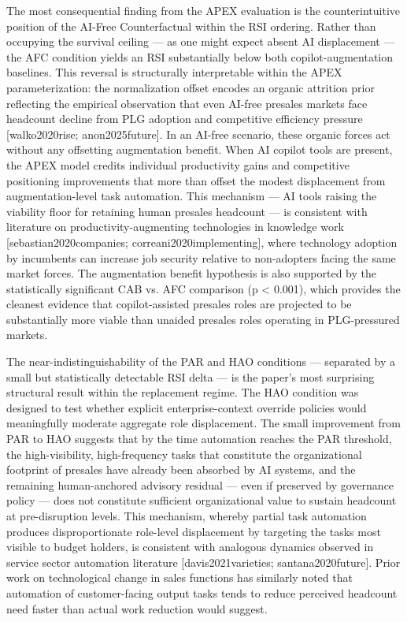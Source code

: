 \documentclass[10pt, conference]{IEEEtran}
\begin{document}
{The most consequential finding from the APEX evaluation is the counterintuitive position of the AI-Free Counterfactual within the RSI ordering. Rather than occupying the survival ceiling --- as one might expect absent AI displacement --- the AFC condition yields an RSI substantially below both copilot-augmentation baselines. This reversal is structurally interpretable within the APEX parameterization: the normalization offset encodes an organic attrition prior reflecting the empirical observation that even AI-free presales markets face headcount decline from PLG adoption and competitive efficiency pressure [walko2020rise; anon2025future]. In an AI-free scenario, these organic forces act without any offsetting augmentation benefit. When AI copilot tools are present, the APEX model credits individual productivity gains and competitive positioning improvements that more than offset the modest displacement from augmentation-level task automation. This mechanism --- AI tools raising the viability floor for retaining human presales headcount --- is consistent with literature on productivity-augmenting technologies in knowledge work [sebastian2020companies; correani2020implementing], where technology adoption by incumbents can increase job security relative to non-adopters facing the same market forces. The augmentation benefit hypothesis is also supported by the statistically significant CAB vs. AFC comparison (p < 0.001), which provides the cleanest evidence that copilot-assisted presales roles are projected to be substantially more viable than unaided presales roles operating in PLG-pressured markets.

The near-indistinguishability of the PAR and HAO conditions --- separated by a small but statistically detectable RSI delta --- is the paper's most surprising structural result within the replacement regime. The HAO condition was designed to test whether explicit enterprise-context override policies would meaningfully moderate aggregate role displacement. The small improvement from PAR to HAO suggests that by the time automation reaches the PAR threshold, the high-visibility, high-frequency tasks that constitute the organizational footprint of presales have already been absorbed by AI systems, and the remaining human-anchored advisory residual --- even if preserved by governance policy --- does not constitute sufficient organizational value to sustain headcount at pre-disruption levels. This mechanism, whereby partial task automation produces disproportionate role-level displacement by targeting the tasks most visible to budget holders, is consistent with analogous dynamics observed in service sector automation literature [davis2021varieties; santana2020future]. Prior work on technological change in sales functions \cite{groene2024introduction} has similarly noted that automation of customer-facing output tasks tends to reduce perceived headcount need faster than actual work reduction would suggest.

}
\end{document}
